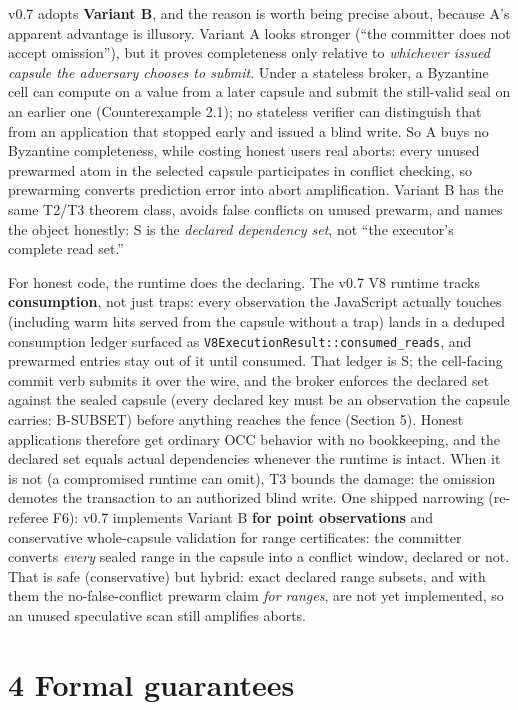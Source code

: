 \documentclass[
  11pt,
]{article}
\begin{document}
v0.7 adopts \textbf{Variant B}, and the reason is worth being precise about, because A's apparent advantage is illusory. Variant A looks stronger (``the committer does not accept omission''), but it proves completeness only relative to \emph{whichever issued capsule the adversary chooses to submit}. Under a stateless broker, a Byzantine cell can compute on a value from a later capsule and submit the still-valid seal on an earlier one (Counterexample 2.1); no stateless verifier can distinguish that from an application that stopped early and issued a blind write. So A buys no Byzantine completeness, while costing honest users real aborts: every unused prewarmed atom in the selected capsule participates in conflict checking, so prewarming converts prediction error into abort amplification. Variant B has the same T2/T3 theorem class, avoids false conflicts on unused prewarm, and names the object honestly: S is the \emph{declared dependency set}, not ``the executor's complete read set.''

For honest code, the runtime does the declaring. The v0.7 V8 runtime tracks \textbf{consumption}, not just traps: every observation the JavaScript actually touches (including warm hits served from the capsule without a trap) lands in a deduped consumption ledger surfaced as \texttt{V8ExecutionResult::consumed\_reads}, and prewarmed entries stay out of it until consumed. That ledger is S; the cell-facing commit verb submits it over the wire, and the broker enforces the declared set against the sealed capsule (every declared key must be an observation the capsule carries: B-SUBSET) before anything reaches the fence (Section 5). Honest applications therefore get ordinary OCC behavior with no bookkeeping, and the declared set equals actual dependencies whenever the runtime is intact. When it is not (a compromised runtime can omit), T3 bounds the damage: the omission demotes the transaction to an authorized blind write. One shipped narrowing (re-referee F6): v0.7 implements Variant B \textbf{for point observations} and conservative whole-capsule validation for range certificates: the committer converts \emph{every} sealed range in the capsule into a conflict window, declared or not. That is safe (conservative) but hybrid: exact declared range subsets, and with them the no-false-conflict prewarm claim \emph{for ranges}, are not yet implemented, so an unused speculative scan still amplifies aborts.

\section{4 Formal guarantees}\label{formal-guarantees}
\end{document}
